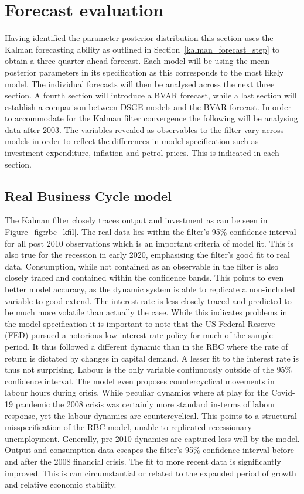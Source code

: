 \documentclass[12pt,a4paper,english]{article} %
\let\oldsection\section
\renewcommand\section{\clearpage\oldsection}
\begin{document}
	\section{Forecast evaluation} \label{forecast_eval}
	Having identified the parameter posterior distribution this section uses the Kalman forecasting ability as outlined in Section~\ref{kalman_forecast_step} to obtain a three quarter ahead forecast. Each model will be using the mean posterior parameters in its specification as this corresponds to the most likely model. The individual forecasts will then be analysed across the next three section. A fourth section will introduce a \ac{BVAR} forecast, while a last section will establish a comparison between DSGE models and the \ac{BVAR} forecast. In order to accommodate for the Kalman filter convergence the following will be analysing data after 2003. The variables revealed as observables to the filter vary across models in order to reflect the differences in model specification such as investment expenditure, inflation and petrol prices. This is indicated in each section.
	
	\subsection{Real Business Cycle model}	
	The Kalman filter closely traces output and investment as can be seen in Figure~\ref{fig:rbc_kfil}. The real data lies within the filter's 95\% confidence interval for all post 2010 observations which is an important criteria of model fit. This is also true for the recession in early 2020, emphasising the filter's good  fit to real data. Consumption, while not contained as an observable in the filter is also closely traced and contained within the confidence bands. This points to even better model accuracy, as the dynamic system is able to replicate a non-included variable to good extend. The interest rate is less closely traced and predicted to be much more volatile than actually the case. While this indicates problems in the model specification it is important to note that the US Federal Reserve (FED) pursued a notorious low interest rate policy for much of the sample period. It thus followed a different dynamic than in the RBC where the rate of return is dictated by changes in capital demand. A lesser fit to the interest rate is thus not surprising. Labour is the only variable continuously outside of the 95\% confidence interval. The model even proposes countercyclical movements in labour hours during crisis. While peculiar dynamics where at play for the Covid-19 pandemic the 2008 crisis was certainly more standard in-terms of labour response, yet the labour dynamics are countercyclical. This points to a structural misspecification of the RBC model, unable to replicated recessionary unemployment.
	Generally, pre-2010 dynamics are captured less well by the model. Output and consumption data escapes the filter's 95\% confidence interval before and after the 2008 financial crisis. The fit to more recent data is significantly improved. This is can circumstantial or related to the expanded period of growth and relative economic stability.
				
\end{document}
